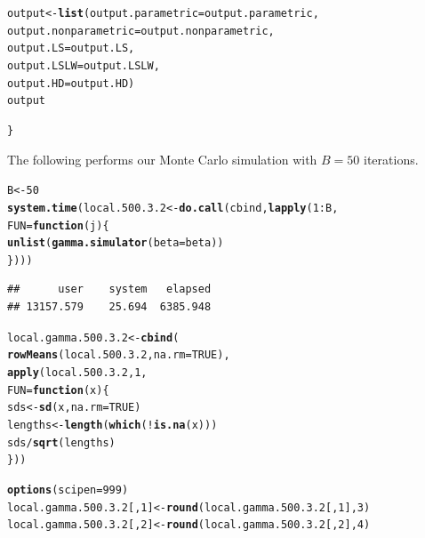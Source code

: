 \documentclass[11pt]{article}\usepackage[]{graphicx}\usepackage[]{color}
\makeatletter
\newcommand{\hlnum}[1]{\textcolor[rgb]{0.686,0.059,0.569}{#1}}%
\newcommand{\hlopt}[1]{\textcolor[rgb]{0,0,0}{#1}}%
\newcommand{\hlstd}[1]{\textcolor[rgb]{0.345,0.345,0.345}{#1}}%
\newcommand{\hlkwa}[1]{\textcolor[rgb]{0.161,0.373,0.58}{\textbf{#1}}}%
\newcommand{\hlkwb}[1]{\textcolor[rgb]{0.69,0.353,0.396}{#1}}%
\newcommand{\hlkwc}[1]{\textcolor[rgb]{0.333,0.667,0.333}{#1}}%
\newcommand{\hlkwd}[1]{\textcolor[rgb]{0.737,0.353,0.396}{\textbf{#1}}}%
\newenvironment{kframe}{%
 \def\at@end@of@kframe{}%
 \ifinner\ifhmode%
  \def\at@end@of@kframe{\end{minipage}}%
  \begin{minipage}{\columnwidth}%
 \fi\fi%
 \def\FrameCommand##1{\hskip\@totalleftmargin \hskip-\fboxsep
 \colorbox{shadecolor}{##1}\hskip-\fboxsep
     \hskip-\linewidth \hskip-\@totalleftmargin \hskip\columnwidth}%
 \MakeFramed {\advance\hsize-\width
   \@totalleftmargin\z@ \linewidth\hsize
   \@setminipage}}%
 {\par\unskip\endMakeFramed%
 \at@end@of@kframe}
\newenvironment{knitrout}{}{} %
\makeatother
\begin{document}
\begin{knitrout}
\begin{kframe}
\begin{alltt}
  \hlstd{output} \hlkwb{<-} \hlkwd{list}\hlstd{(}\hlkwc{output.parametric} \hlstd{= output.parametric,}
    \hlkwc{output.nonparametric} \hlstd{= output.nonparametric,}
    \hlkwc{output.LS} \hlstd{= output.LS,}
    \hlkwc{output.LSLW} \hlstd{= output.LSLW,}
    \hlkwc{output.HD} \hlstd{= output.HD)}
  \hlstd{output}

\hlstd{\}}
\end{alltt}
\end{kframe}
\end{knitrout}

The following performs our Monte Carlo simulation with $B = 50$ iterations. 

\begin{knitrout}
\color{fgcolor}\begin{kframe}
\begin{alltt}
\hlstd{B} \hlkwb{<-} \hlnum{50}
\hlkwd{system.time}\hlstd{(local.500.3.2} \hlkwb{<-} \hlkwd{do.call}\hlstd{(cbind,} \hlkwd{lapply}\hlstd{(}\hlnum{1}\hlopt{:}\hlstd{B,}
  \hlkwc{FUN} \hlstd{=} \hlkwa{function}\hlstd{(}\hlkwc{j}\hlstd{)\{}
    \hlkwd{unlist}\hlstd{(}\hlkwd{gamma.simulator}\hlstd{(}\hlkwc{beta} \hlstd{= beta))}
\hlstd{\})))}
\end{alltt}
\begin{verbatim}
##      user    system   elapsed 
## 13157.579    25.694  6385.948
\end{verbatim}
\end{kframe}
\end{knitrout}

\begin{knitrout}
\color{fgcolor}\begin{kframe}
\begin{alltt}
\hlstd{local.gamma.500.3.2} \hlkwb{<-} \hlkwd{cbind}\hlstd{(}
  \hlkwd{rowMeans}\hlstd{(local.500.3.2,} \hlkwc{na.rm} \hlstd{=} \hlnum{TRUE}\hlstd{),}
  \hlkwd{apply}\hlstd{(local.500.3.2,} \hlnum{1}\hlstd{,}
  \hlkwc{FUN} \hlstd{=} \hlkwa{function}\hlstd{(}\hlkwc{x}\hlstd{)\{}
    \hlstd{sds} \hlkwb{<-} \hlkwd{sd}\hlstd{(x,} \hlkwc{na.rm} \hlstd{=} \hlnum{TRUE}\hlstd{)}
    \hlstd{lengths} \hlkwb{<-} \hlkwd{length}\hlstd{(}\hlkwd{which}\hlstd{(}\hlopt{!}\hlkwd{is.na}\hlstd{(x)))}
    \hlstd{sds} \hlopt{/} \hlkwd{sqrt}\hlstd{(lengths)}
  \hlstd{\}))}

\hlkwd{options}\hlstd{(}\hlkwc{scipen} \hlstd{=} \hlnum{999}\hlstd{)}
\hlstd{local.gamma.500.3.2[,} \hlnum{1}\hlstd{]} \hlkwb{<-} \hlkwd{round}\hlstd{(local.gamma.500.3.2[,} \hlnum{1}\hlstd{],} \hlnum{3}\hlstd{)}
\hlstd{local.gamma.500.3.2[,} \hlnum{2}\hlstd{]} \hlkwb{<-} \hlkwd{round}\hlstd{(local.gamma.500.3.2[,} \hlnum{2}\hlstd{],} \hlnum{4}\hlstd{)}
\end{alltt}
\end{kframe}
\end{knitrout}
\end{document}
